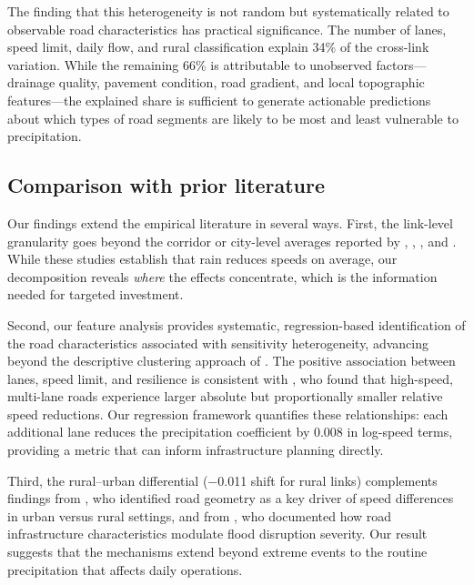 \documentclass[review]{elsarticle}
\begin{document}
The finding that this heterogeneity is not random but systematically related to observable road characteristics has practical significance. The number of lanes, speed limit, daily flow, and rural classification explain 34\% of the cross-link variation. While the remaining 66\% is attributable to unobserved factors---drainage quality, pavement condition, road gradient, and local topographic features---the explained share is sufficient to generate actionable predictions about which types of road segments are likely to be most and least vulnerable to precipitation.

\subsection{Comparison with prior literature}
\label{sec:disc:lit}

Our findings extend the empirical literature in several ways. First, the link-level granularity goes beyond the corridor or city-level averages reported by \citet{hranac2006empirical}, \citet{becker2026rainfall}, \citet{koetse2009impact}, and \citet{bi2022weather}. While these studies establish that rain reduces speeds on average, our decomposition reveals \textit{where} the effects concentrate, which is the information needed for targeted investment.

Second, our feature analysis provides systematic, regression-based identification of the road characteristics associated with sensitivity heterogeneity, advancing beyond the descriptive clustering approach of \citet{gao2024resilience}. The positive association between lanes, speed limit, and resilience is consistent with \citet{becker2026rainfall}, who found that high-speed, multi-lane roads experience larger absolute but proportionally smaller relative speed reductions. Our regression framework quantifies these relationships: each additional lane reduces the precipitation coefficient by 0.008 in log-speed terms, providing a metric that can inform infrastructure planning directly.

Third, the rural--urban differential ($-$0.011 shift for rural links) complements findings from \citet{raccagni2024urban}, who identified road geometry as a key driver of speed differences in urban versus rural settings, and from \citet{pregnolato2017depth}, who documented how road infrastructure characteristics modulate flood disruption severity. Our result suggests that the mechanisms extend beyond extreme events to the routine precipitation that affects daily operations.
\end{document}
